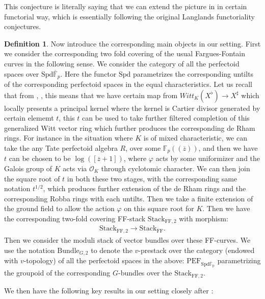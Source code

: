 \documentclass[12pt]{book}
\theoremstyle{definition}
\newtheorem{definition}{Definition}
\begin{document}
\indent This conjecture is literally saying that we can extend the picture in \cite{FS} in certain functorial way, which is essentially following the original Langlands functoriality conjectures.

\begin{definition}
Now introduce the corresponding main objects in our setting. First we consider the corresponding two fold covering of the usual Fargues-Fontain curves in the following sense. We consider the category of all the perfectoid spaces over $\mathrm{Spd}\overline{\mathbb{F}}_p$. Here the functor $\mathrm{Spd}$ parametrizes the corresponding untilts of the corresponding perfectoid spaces in the equal characteristics. Let us recall that from \cite{SchI}, \cite{KLI}, \cite{KLII} this means that we have certain map from $Witt_{K}(X^\flat) \rightarrow X^\sharp$ which locally presents a principal kernel where the kernel is Cartier divisor generated by certain elememt $t$, this $t$ can be used to take further filtered completion of this generalized Witt vector ring which further produces the corresponding de Rham rings. For instance in the situation where $K$ is of mixed characteristic, we can take the any Tate perfectoid algebra $R$, over some $\mathbb{F}_p((\overline{z}))$, and then we have $t$ can be chosen to be $\log([\overline{z}+1])$, where $\varphi$ acts by some uniformizer and the Galois group of $K$ acts via $\mathcal{O}_K$ through cyclotomic character. We can then join the square root of $t$ in both these two stages, with the corresponding same notation $t^{1/2}$, which produces further extension of the de Rham rings and the corresponding Robba rings with each untilts. Then we take a finite extension of the ground field to allow the action $\varphi$ on this square root for $K$. Then we have the corresponding two-fold covering FF-stack $\mathrm{Stack}_{\mathrm{FF},2}$ with morphism:
\begin{align}
\mathrm{Stack}_{\mathrm{FF},2}\rightarrow \mathrm{Stack}_{\mathrm{FF}}.
\end{align}
Then we consider the moduli stack of vector bundles over these FF-curves. We use the notation $\mathrm{Bundle}_{G,2}$ to denote the $v$-prestack over the category (endowed with $v$-topology) of all the perfectoid spaces in the above: $\mathrm{PEF}_\mathrm{\mathrm{Spd}\overline{\mathbb{F}}_p}$ parametrizing the groupoid of the corresponding $G$-bundles over the $\mathrm{Stack}_{\mathrm{FF},2}$.
\end{definition}

\indent We then have the following key results in our setting closely after \cite[Chapter III, Chapter IV, Chapter V]{FS}:
\end{document}
